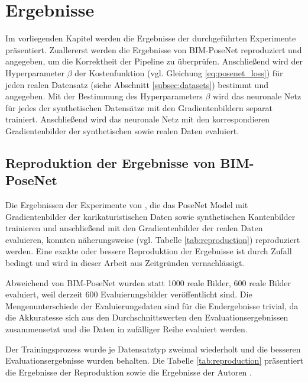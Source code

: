 
\section{Ergebnisse}
Im vorliegenden Kapitel werden die Ergebnisse der durchgeführten Experimente präsentiert. Zuallererst werden die Ergebnisse von BIM-PoseNet \cite{acharyaBIMPoseNetIndoorCamera2019} reproduziert und angegeben, um die Korrektheit der Pipeline zu überprüfen. Anschließend wird der Hyperparameter $\beta$ der Kostenfunktion (vgl. Gleichung \ref{eq:posenet_loss}) für jeden realen Datensatz (siehe Abschnitt \ref{subsec:datasets}) bestimmt und angegeben. Mit der Bestimmung des Hyperparameters $\beta$ wird das neuronale Netz für jedes der synthetischen Datensätze mit den Gradientenbildern separat trainiert. Anschließend wird das neuronale Netz mit den korrespondieren Gradientenbilder der synthetischen sowie realen Daten evaluiert.

\subsection{Reproduktion der Ergebnisse von BIM-PoseNet}
Die Ergebnissen der Experimente von \citet{acharyaBIMPoseNetIndoorCamera2019}, die das PoseNet Model mit Gradientenbilder der karikaturistischen Daten sowie synthetischen Kantenbilder trainieren und anschließend mit den Gradientenbilder der realen Daten evaluieren, konnten näherungsweise (vgl. Tabelle \ref{tab:reproduction}) reproduziert werden. Eine exakte oder bessere Reproduktion der Ergebnisse ist durch Zufall bedingt und wird in dieser Arbeit aus Zeitgründen vernachlässigt.

Abweichend von BIM-PoseNet wurden statt 1000 reale Bilder, 600 reale Bilder evaluiert, weil derzeit 600 Evaluierungsbilder veröffentlicht sind. Die Mengenunterschiede der Evaluierungsdaten sind für die Endergebnisse trivial, da die Akkuratesse sich aus den Durchschnittswerten den Evaluationsergebnissen zusammensetzt und die Daten in zufälliger Reihe evaluiert werden. 

Der Trainingsprozess wurde je Datensatztyp zweimal wiederholt und die besseren Evaluationsergebnisse wurden behalten. Die Tabelle \ref{tab:reproduction} präsentiert die Ergebnisse der Reproduktion sowie die Ergebnisse der Autoren \citet{acharyaBIMPoseNetIndoorCamera2019}.


